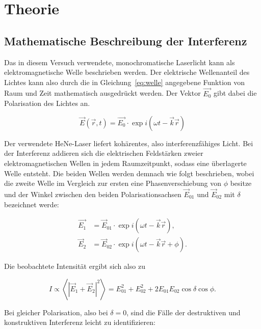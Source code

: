 
\section{Theorie}
\subsection{Mathematische Beschreibung der Interferenz}

Das in diesem Versuch verwendete, monochromatische Laserlicht kann als elektromagnetische Welle
beschrieben werden. Der elektrische Wellenanteil des Lichtes kann also durch die in
Gleichung~\eqref{eq:welle} angegebene Funktion von Raum und Zeit mathematisch ausgedrückt werden. Der Vektor $\vec{E_0}$ gibt dabei die Polarisation des Lichtes an.

\begin{equation}
	\vec{E}(\vec{r},t) = \vec{E_0}\cdot \exp i(\omega t - \vec{k}\vec{r})
\label{eq:welle}
\end{equation}

Der verwendete HeNe-Laser liefert kohärentes, also interferenzfähiges Licht. Bei der Interferenz
addieren sich die elektrischen Feldstärken zweier elektromagnetischen Wellen in jedem Raumzeitpunkt, sodass eine überlagerte Welle entsteht. Die beiden Wellen werden demnach wie folgt beschrieben, wobei die zweite Welle im Vergleich zur ersten eine Phasenverschiebung von $\phi$ besitze und der Winkel zwischen den beiden Polarisationsachsen $\vec{E}_{01}$ und $\vec{E}_{02}$ mit $\delta$ bezeichnet werde:

\begin{align}
\vec{E_1} &= \vec{E}_{01}\cdot \exp i(\omega t - \vec{k}\vec{r}),\\
\vec{E}_2 &= \vec{E}_{02}\cdot \exp i(\omega t - \vec{k} \vec{r} + \phi).
\end{align}

Die beobachtete Intensität ergibt sich also zu

\begin{equation}
I \propto \left<\left|\vec{E}_1+\vec{E}_2\right|^2\right>
=E_{01}^2 + E_{02}^2 + 2E_{01}E_{02}\cos\delta \cos\phi.
\label{eq:intense}
\end{equation}

Bei gleicher Polarisation, also bei $\delta = 0$, sind die Fälle der destruktiven und konstruktiven Interferenz leicht zu identifizieren:

